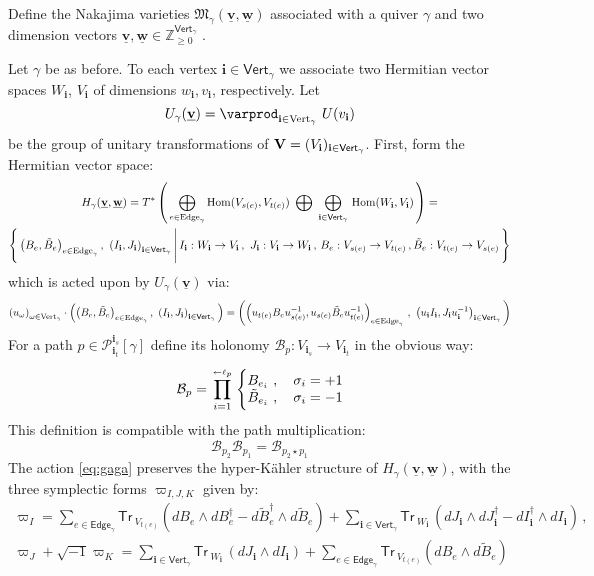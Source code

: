 \documentclass[12pt]{amsart}
\newcommand {\3}{\underline{\bf 3}}
\newcommand {\4}{\underline{\bf 4}}
\newcommand {\6}{\underline{\bf 6}}
\newcommand{\beq}{\begin{equation}}
\newcommand{\eeq}{\end{equation}}
\newcommand{\mM}{{\mathfrak M}}
\newcommand {\ib} {\mathbf{i}}
\newcommand {\bv} {\underline{\mathbf{v}}}
\newcommand {\bw} {\underline{\mathbf{w}}}
\newcommand {\BZ}   {\mathbb Z}
\newcommand {\CalB} {\mathcal B}
\newcommand {\CalP} {\mathcal P}
\newcommand{\Vg}{\mathsf{Vert}_{\gamma}}
\newcommand{\Eg}{\mathsf{Edge}_{\gamma}}
\newcommand{\Tr}{\mathsf{Tr}\,}
\begin{document}
Define the Nakajima varieties ${\mM}_{\gamma}({\bv}, {\bw})$   associated with a quiver $\gamma$ and two dimension vectors ${\bv}, {\bw} \in {\BZ}^{\Vg}_{\geq 0}$ \cite{Nakajima:1994, Nakajima:1994r, Nakajima:1998}. 

Let $\gamma$ be as before. To each vertex $\ib \in \Vg$ we associate two Hermitian vector spaces $W_{\ib}$, $V_{\ib}$ of dimensions $w_{\ib}, v_{\ib}$, respectively. Let 
\beq
U_{\gamma} ({\bv}) = \varprod_{\ib \in {\rm Vert}_{\gamma}}\ U(v_{\ib})
\label{eq:ubv}
\eeq
be the group of unitary transformations of ${\bf V} = ( V_{\ib} )_{{\ib}\in {\Vg}}$. 
First, form the Hermitian vector space:
\begin{multline}
H_{\gamma} ({\bv}, {\bw}) = T^{*} \left( \, \bigoplus_{e \in {\rm Edge}_{\gamma}} {\rm Hom} (V_{s(e)}, V_{t(e)})  \ \bigoplus \ \bigoplus_{{\ib} \in {\Vg}} \, {\rm Hom} (W_{\ib}, V_{\ib}) \, \right) = \\
\Biggl\{ \, \left( B_{e}, {\tilde B}_{e} \right)_{e \in {\rm Edge}_{\gamma}}, \ \left( I_{\ib}, J_{\ib} \right)_{\ib \in \Vg} \, \Biggr\vert \, I_{\ib}: W_{\ib} \to V_{\ib}\, , \ J_{\ib}: V_{\ib} \to W_{\ib} \, , \, B_{e} : V_{s(e)} \to V_{t(e)} \, , {\tilde B}_{e} : V_{t(e)} \to V_{s(e)} \, \Biggr\} \label{eq:adhmnak}
\end{multline}
which is acted upon by $U_{\gamma} ({\bv})$ via:
\beq
\left( u_{\omega} \right)_{\omega \in {\rm Vert}_{\gamma}} \cdot \left( \left( B_{e}, {\tilde B}_{e} \right)_{e \in {\rm Edge}_{\gamma}}, \ \left( I_{\ib}, J_{\ib} \right)_{\ib \in \Vg} \, \right) = \left( \left( u_{t(e)} B_{e} u_{s(e)}^{-1}, u_{s(e)} {\tilde B}_{e} u_{t(e)}^{-1} \right)_{e \in {\rm Edge}_{\gamma}} \, , \ \left( u_{\ib} I_{\ib}, J_{\ib} u_{\ib}^{-1} \right)_{\ib \in \Vg}  \, \right)
\label{eq:gaga}
\eeq
For a path $p \in {\CalP}_{{\ib}_{t}}^{{\ib}_{s}}[{\gamma}]$ define its holonomy ${\CalB}_{p}: V_{{\ib}_{s}} \to V_{{\ib}_{t}}$ in the obvious way: 
\beq
{\CalB}_{p} = \prod_{i=1}^{\atop{\leftarrow}{{\ell}_{p}}}
\, \Biggl\{  \begin{matrix}
 B_{e_{i}}\ , \quad {\sigma}_{i} = +1 \\
 {\tilde B}_{e_{i}}\ , \quad {\sigma}_{i} = - 1\end{matrix}
\label{eq:bmon}
\eeq
This definition is compatible with the path multiplication:
\beq
{\CalB}_{p_{2}} {\CalB}_{p_{1}} = {\CalB}_{p_{2}\star p_{1}}
\eeq
The action \eqref{eq:gaga} preserves the hyper-K\"ahler structure of $H_{\gamma} ({\bv}, {\bw})$, with
the three symplectic forms ${\varpi}_{I, J, K}$ given by:
\begin{multline}
{\varpi}_{I} = \sum_{e \in {\Eg}} {\Tr}_{V_{t(e)}} \left(  dB_{e} \wedge dB_{e}^{\dagger} - d{\tilde B}_{e}^{\dagger} \wedge d{\tilde B}_{e} \right) +  \sum_{{\ib} \in {\Vg}} {\Tr}_{W_{\ib}}\, \left( dJ_{\ib} \wedge dJ^{\dagger}_{\ib} - dI^{\dagger}_{\ib} \wedge dI_{\ib} \right) \, , \\
{\varpi}_{J} + \sqrt{-1} {\varpi}_{K} = \sum_{{\ib} \in {\Vg}} {\Tr}_{W_{\ib}}\, \left( dJ_{\ib} \wedge dI_{\ib} \right) + \sum_{e \in {\Eg}} {\Tr}_{V_{t(e)}} \left(  dB_{e} \wedge  d{\tilde B}_{e} \right) 
\end{multline}
\end{document}
